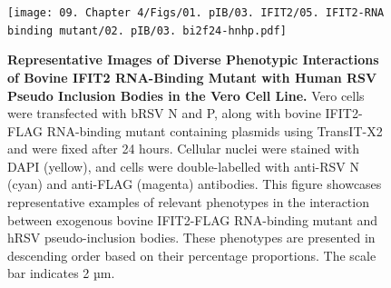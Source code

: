 \begin{figure}
    \label{fig:Diverse Phenotypic Interactions of Bovine IFIT2 RNA-Binding Mutant with Human RSV Pseudo Inclusion Bodies in the Vero Cell Line}
\end{figure}

\begin{figure}
    \centering
    \texttt{[image: 09. Chapter 4/Figs/01. pIB/03. IFIT2/05. IFIT2-RNA binding mutant/02. pIB/03. bi2f24-hnhp.pdf]}
    \caption[Representative Images of Diverse Phenotypic Interactions of Bovine IFIT2 RNA-Binding Mutant with Human RSV Pseudo Inclusion Bodies in the Vero Cell Line.]{\textbf{Representative Images of Diverse Phenotypic Interactions of Bovine IFIT2 RNA-Binding Mutant with Human RSV Pseudo Inclusion Bodies in the Vero Cell Line.}  Vero cells were transfected with bRSV N and P, along with bovine IFIT2-FLAG RNA-binding mutant containing plasmids using TransIT-X2 and were fixed after 24 hours. Cellular nuclei were stained with DAPI (yellow), and cells were double-labelled with anti-RSV N (cyan) and anti-FLAG (magenta) antibodies. This figure showcases representative examples of relevant phenotypes in the interaction between exogenous bovine IFIT2-FLAG RNA-binding mutant and hRSV pseudo-inclusion bodies. These phenotypes are presented in descending order based on their percentage proportions. The scale bar indicates 2 µm.}
    \label{fig:Representative Images of Diverse Phenotypic Interactions of Bovine IFIT2 RNA-Binding Mutant with Human RSV Pseudo Inclusion Bodies in the Vero Cell Line}
\end{figure}

